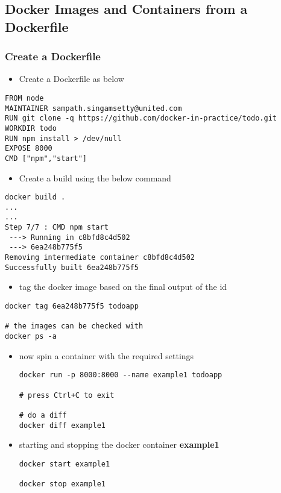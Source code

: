 \documentclass[11pt]{article}
\begin{document}
\subsection{Docker Images and Containers from a Dockerfile}
\label{sec:org09e6921}
\subsubsection{Create a Dockerfile}
\label{sec:org396e3ca}

\begin{itemize}
\item Create a Dockerfile as below
\end{itemize}
\begin{verbatim}
FROM node
MAINTAINER sampath.singamsetty@united.com
RUN git clone -q https://github.com/docker-in-practice/todo.git
WORKDIR todo
RUN npm install > /dev/null
EXPOSE 8000
CMD ["npm","start"]
\end{verbatim}

\begin{itemize}
\item Create a build using the below command
\end{itemize}
\begin{verbatim}
docker build .
...
...
Step 7/7 : CMD npm start
 ---> Running in c8bfd8c4d502
 ---> 6ea248b775f5
Removing intermediate container c8bfd8c4d502
Successfully built 6ea248b775f5
\end{verbatim}

\begin{itemize}
\item tag the docker image based on the final output of the id
\end{itemize}
\begin{verbatim}
docker tag 6ea248b775f5 todoapp

# the images can be checked with
docker ps -a
\end{verbatim}

\begin{itemize}
\item now spin a container with the required settings
\begin{verbatim}
docker run -p 8000:8000 --name example1 todoapp

# press Ctrl+C to exit

# do a diff
docker diff example1
\end{verbatim}

\item starting and stopping the docker container \textbf{example1}
\begin{verbatim}
docker start example1

docker stop example1
\end{verbatim}
\end{itemize}
\end{document}

